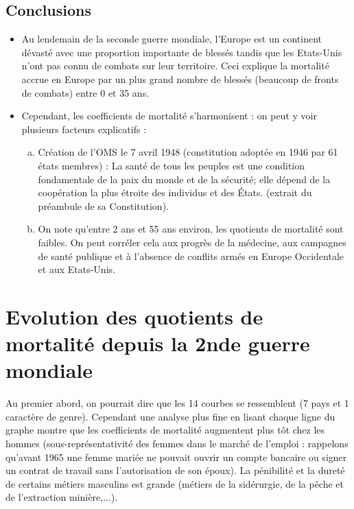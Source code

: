 \documentclass{article}
\def\ffg{\fg\,\,}%
\begin{document}
\subsection{Conclusions}

\begin{itemize}

\item Au lendemain de la seconde guerre mondiale, l'Europe est un continent dévasté avec une proportion importante de blessés tandis que les Etats-Unis n'ont pas connu de combats sur leur territoire. Ceci explique la mortalité accrue en Europe par un plus grand nombre de blessés (beaucoup de fronts de combats) entre 0 et 35 ans.

\item Cependant, les coefficients de mortalité s'harmonisent : on peut y voir plusieurs facteurs explicatifs :

\begin{enumerate}[a)]
\item Création de l'OMS le 7 avril 1948 (constitution adoptée en 1946 par 61 états membres) : \og La santé de tous les peuples est une condition fondamentale de la paix du monde et de la sécurité; elle dépend de la coopération la plus étroite des individus et des États.\ffg (extrait du préambule de sa Constitution).

\item On note qu'entre 2 ans et 55 ans environ, les quotients de mortalité sont faibles. On peut corréler cela aux progrès de la médecine, aux campagnes de santé publique et à l'absence de conflits armés en Europe Occidentale et aux Etats-Unis.
\end{enumerate}

\end{itemize}

\section{Evolution des quotients de mortalité depuis la 2nde guerre mondiale}

\noindent Au premier abord, on pourrait dire que les 14 courbes se ressemblent (7 pays et 1 caractère de genre). Cependant une analyse plus fine en lisant chaque ligne du graphe montre que les coefficients de mortalité augmentent plus tôt chez les hommes (sous-représentativité des femmes dans le marché de l'emploi : rappelons qu'avant 1965 une femme mariée ne pouvait ouvrir un compte bancaire ou signer un contrat de travail sans l'autorisation de son époux). La pénibilité et la dureté de certains métiers masculins est grande (métiers de la sidérurgie, de la pêche et de l'extraction minière,...).
\end{document}
